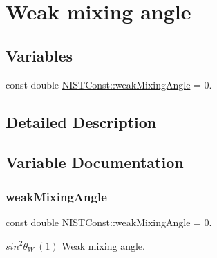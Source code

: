 \hypertarget{group___n_i_s_t_const-_weak_mixing_angle}{}\section{Weak mixing angle}
\label{group___n_i_s_t_const-_weak_mixing_angle}
\subsection*{Variables}
\begin{DoxyCompactItemize}
\item 
const double \mbox{\hyperlink{group___n_i_s_t_const-_weak_mixing_angle_gaf4037fe32df08c9c7eccd8487b5eab34}{N\+I\+S\+T\+Const\+::weak\+Mixing\+Angle}} = 0.
\end{DoxyCompactItemize}


\subsection{Detailed Description}


\subsection{Variable Documentation}
\mbox{\label{group___n_i_s_t_const-_weak_mixing_angle_gaf4037fe32df08c9c7eccd8487b5eab34}} 
\subsubsection{\texorpdfstring{weak\+Mixing\+Angle}{weakMixingAngle}}
{\footnotesize\ttfamily const double N\+I\+S\+T\+Const\+::weak\+Mixing\+Angle = 0.}

$sin^2 \theta_W \ (1)$ Weak mixing angle. 